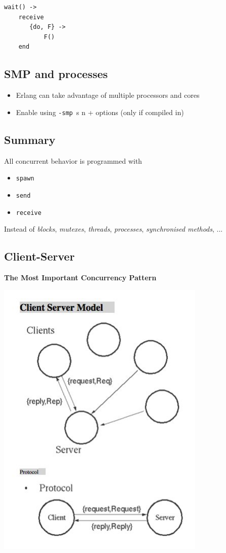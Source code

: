 \documentclass[12pt]{article}
\begin{document}
\begin{itemize}
\begin{verbatim}
wait() ->
    receive
       {do, F} ->
           F()
    end
\end{verbatim}

\subsection{SMP and processes}

\begin{itemize}
\item Erlang can take advantage of multiple processors and cores
\item Enable using \verb+-smp +s n + options (only if compiled in)
\end{itemize}

\subsection{Summary}

All concurrent behavior is programmed with

\begin{itemize}
\item \verb+spawn+
\item \verb+send+
\item \verb+receive+
\end{itemize}

Instead of {\sl blocks}, {\sl mutexes}, {\sl threads}, {\sl
  processes}, {\sl synchronised methods}, ...

\subsection{Client-Server}

{\bf The Most Important Concurrency Pattern}

\includegraphics[width=10cm]{images/cs.jpg}


\end{itemize}
\end{document}
